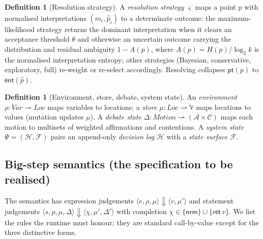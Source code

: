 \documentclass[11pt,a4paper]{article}
\theoremstyle{plain}
\theoremstyle{definition}
\newtheorem{definition}[theorem]{Definition}
\theoremstyle{remark}
\newcommand{\Val}{\mathbb{V}}
\newcommand{\env}{\rho}
\newcommand{\store}{\mu}
\newcommand{\dbt}{\Delta}
\newcommand{\sys}{\Psi}
\newcommand{\evalto}{\Downarrow}           %
\begin{document}
\begin{definition}[Resolution strategy]
\label{def:strategy}
A \emph{resolution strategy} $\varsigma$ maps a point $p$ with normalised
interpretations $\overline{(m_i,\hat p_i)}$ to a determinate outcome: the
maximum-likelihood strategy returns the dominant interpretation when it clears
an acceptance threshold $\theta$ and otherwise an uncertain outcome carrying the
distribution and residual ambiguity $1-A(p)$, where $A(p)=H(p)/\log_2 k$ is the
normalised interpretation entropy; other strategies (Bayesian, conservative,
exploratory, full) re-weight or re-select accordingly. Resolving collapses
$\mathsf{pt}(p)$ to $\mathsf{ent}(\hat p)$.
\end{definition}

\begin{definition}[Environment, store, debate, system state]
\label{def:state}
An \emph{environment} $\env\colon\mathit{Var}\rightharpoonup\mathit{Loc}$ maps
variables to locations; a \emph{store} $\store\colon\mathit{Loc}\rightharpoonup
\Val$ maps locations to values (mutation updates $\store$). A \emph{debate
state} $\dbt\colon\mathit{Motion}\rightharpoonup(\mathcal{A}\times\mathcal{C})$
maps each motion to multisets of weighted affirmations and contentions. A
\emph{system state} $\sys=(\mathcal{H},\mathcal{F})$ pairs an append-only
\emph{decision log} $\mathcal{H}$ with a \emph{state surface} $\mathcal{F}$.
\end{definition}

\subsection{Big-step semantics (the specification to be realised)}

The semantics has expression judgements $\langle e,\env,\store\rangle\evalto
\langle v,\store'\rangle$ and statement judgements $\langle s,\env,\store,\dbt
\rangle\evalto\langle\chi,\store',\dbt'\rangle$ with completion $\chi\in\{\mathsf
{nrm}\}\cup\{\mathsf{ret}\,v\}$. We list the rules the runtime must honour; they
are standard call-by-value \citep{winskel1993,pierce2002} except for the three
distinctive forms.
\end{document}
